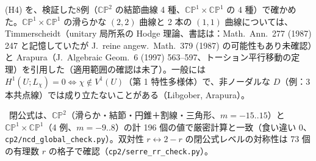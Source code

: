 \begin{rem}[\tQ\ G2 について]
(H4) を、検証した8例（$\mathbb{CP}^2$ の結節曲線 4 種、$\mathbb{CP}^1\times\mathbb{CP}^1$ の 4 種）で確かめた。$\mathbb{CP}^1\times\mathbb{CP}^1$ の滑らかな $(2,2)$ 曲線と 2 本の $(1,1)$ 曲線については、Timmerscheidt（unitary 局所系の Hodge 理論、書誌は\tQ：Math.\ Ann.\ 277 (1987) 247 と記憶していたが J.\ reine angew.\ Math.\ 379 (1987) の可能性もあり未確認）と Arapura（J.\ Algebraic Geom.\ 6 (1997) 563--597、トーション平行移動の定理）を引用した（適用範囲の確認は未了\tQ）。一般には $H^1(U;L_\chi)=0\Leftrightarrow\chi\notin V^1(U)$（第 1 特性多様体）で、非ノーダルな $D$（例：3 本共点線）では成り立たないことがある（Libgober, Arapura）。
\end{rem}
\tV\ 閉公式は、$\mathbb{CP}^2$（滑らか・結節・円錐＋割線・三角形、$m=-15..15$）と $\mathbb{CP}^1\times\mathbb{CP}^1$（4 例、$m=-9..8$）の計 196 個の値で厳密計算と一致（食い違い 0、\texttt{cp2/ncd\_global\_check.py}）。双対性 $r\leftrightarrow2-r$ の閉公式レベルの対称性は 73 個の有理数 $r$ の格子で確認（\texttt{cp2/serre\_rr\_check.py}）。

